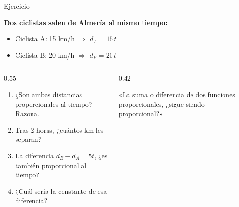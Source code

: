 \documentclass[aspectratio=169, 10pt, spanish]{beamer}
\begin{document}
\begin{frame}{Ejercicio — }
  \begin{evaluarbox}
    \textbf{Dos ciclistas salen de Almería al mismo tiempo:}
    \begin{itemize}
      \item Ciclista A: 15 km/h \quad $\Rightarrow$ \quad $d_A = 15\,t$
      \item Ciclista B: 20 km/h \quad $\Rightarrow$ \quad $d_B = 20\,t$
    \end{itemize}
    \vspace{0.3cm}
    \begin{columns}[t]
      \begin{column}{0.55\textwidth}
        \begin{enumerate}
          \item ¿Son ambas distancias proporcionales al tiempo? Razona.
          \item Tras 2 horas, ¿cuántos km les separan?
          \item La diferencia $d_B - d_A = 5t$, ¿es también proporcional al tiempo?
          \item ¿Cuál sería la constante de esa diferencia?
        \end{enumerate}
      \end{column}
      \begin{column}{0.42\textwidth}
        \begin{notabox}[Reflexión]
          «La suma o diferencia de dos funciones proporcionales, ¿sigue siendo proporcional?»
        \end{notabox}
      \end{column}
    \end{columns}
  \end{evaluarbox}
\end{frame}
\end{document}
